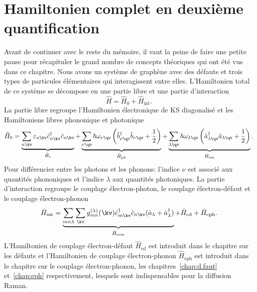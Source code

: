 \section{Hamiltonien complet en deuxième quantification}
Avant de continuer avec le reste du mémoire, il vaut la peine de faire une petite pause pour récapituler le grand nombre de concepts théoriques qui ont été vus dans ce chapitre. Nous avons un système de graphène avec des défauts et trois types de particules élémentaires qui interagissent entre elles. L'Hamiltonien total de ce système se décompose en une partie libre et une partie d'interaction
\begin{equation}
    \hat{H} = \hat{H}_0+\hat{H}_\text{int}.
\end{equation}
La partie libre regroupe l'Hamiltonien électronique de KS diagonalisé et les Hamiltoniens libres phononique et photonique
\begin{equation}
    \hat{H}_0 =\underbrace{\sum_{n\kv}\varepsilon_{n\kv}\hat{c}^\dag_{n\kv}\hat{c}_{n\kv}}_{\hat{H}_\text{e}} + \underbrace{\sum_{\nu\qv}\hbar\omega_{\nu\qv}\left(\hat{b}^\dag_{\nu\qv}\hat{b}_{\nu\qv}+\frac{1}{2}\right)}_{\hat{H}_\text{ph}}+\underbrace{\sum_{\lambda\qv}\hbar\omega_{\lambda\qv}\left(\hat{a}_{\lambda\qv}^\dag \hat{a}_{\lambda\qv}+\frac{1}{2}\right)}_{\hat{H}_\text{em}}.
\end{equation}
Pour différencier entre les photons et les phonons: l'indice $\nu$ est associé aux quantités phononiques et l'indice $\lambda$ aux quantités photoniques. La partie d'interaction regroupe le couplage électron-photon, le couplage électron-défaut et le couplage électron-phonon
\begin{equation}
    \hat{H}_\text{int} = \underbrace{\sum_{mn\lambda}\sum_\kv g_{mn}^{(\lambda)}(\kv)\hat{c}^\dag_{m\kv}\hat{c}_{n\kv}(\hat{a}_\lambda+\hat{a}_\lambda^\dag)}_{\hat{H}_\text{eem}}+\hat{H}_\text{ed}+\hat{H}_\text{eph}.
\end{equation}
L'Hamiltonien de couplage électron-défaut $\hat{H}_\text{ed}$ est introduit dans le chapitre sur les défauts et l'Hamiltonien de couplage électron-phonon $\hat{H}_\text{eph}$ est introduit dans le chapitre sur le couplage électron-phonon, les chapitres~\ref{chap:d.faut} et~\ref{chap:eph} respectivement, lesquels sont indispensables pour la diffusion Raman.

